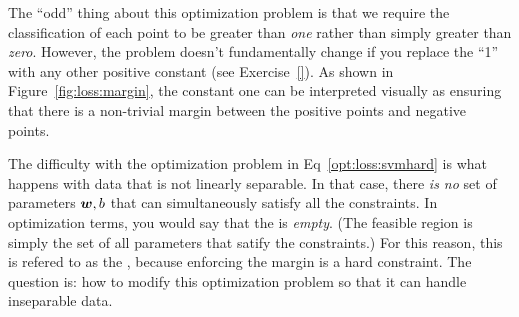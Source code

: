 \begin{comment}
There are two aspects of this optimization problem that are not
immediately obvious.  The first is the constraint that the norm of the
weight vector is at most $1$.  This constraint is necessary in order
to avoid degenerate solutions.  In particular, suppose you solved the
optimization problem \emph{with} this constraint in place.  You found
some optimal solution $\vw^*,b^*$.  Now, consider what happens if you
were to remove the norm constraint.  You could then look at
$2\vw^*,2b$.  The constraints would still be satisfied, but you would
have \emph{doubled} the size of the margin!  You could do this again,
eventually getting an infinitely large margin with $\infty\vw^*,\infty
b$ as parameters.  The constraint on the norm of $\vw$ is to ensure
that this doesn't happen.

\thinkaboutit{You can also think about the constraint on $\vw$ in
  terms of the fact that it's not $\vw$ we care about, but rather the
  hyperplane it defines.  Why does this suggest that constraining the
  norm of $\vw$ is reasonable?}
\end{comment}


The ``odd'' thing about this optimization problem is that we require
the classification of each point to be greater than \emph{one} rather
than simply greater than \emph{zero}.  However, the problem doesn't
fundamentally change if you replace the ``1'' with any other positive
constant (see Exercise~\ref{}).  As shown in
Figure~\ref{fig:loss:margin}, the constant one can be interpreted
visually as ensuring that there is a non-trivial margin between the
positive points and negative points.

The difficulty with the optimization problem in
Eq~\eqref{opt:loss:svmhard} is what happens with data that is not
linearly separable.  In that case, there \emph{is no} set of
parameters ${\boldsymbol{w}},b$ that can simultaneously satisfy all the
constraints.  In optimization terms, you would say that the
 is \emph{empty}.  (The feasible region is
simply the set of all parameters that satify the constraints.)  For
this reason, this is refered to as the ,
because enforcing the margin is a hard constraint.  The question is:
how to modify this optimization problem so that it can handle
inseparable data.


